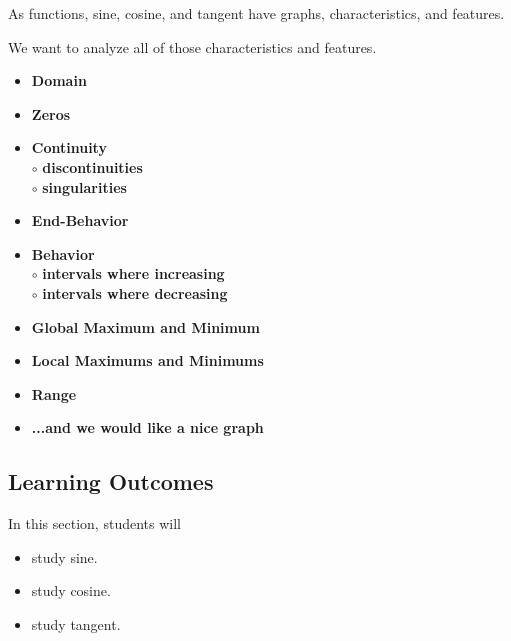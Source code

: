 \documentclass{ximera}
\begin{document}
As functions, sine, cosine, and tangent have graphs, characteristics, and features.


We want to analyze all of those characteristics and features.



\begin{itemize}
     \item \textbf{\textcolor{red!70!black}{Domain}} 
     \item \textbf{\textcolor{red!70!black}{Zeros}} 
     \item \textbf{\textcolor{red!70!black}{Continuity}} \\
     \text{    }$\circ$ \textbf{\textcolor{purple!85!blue}{discontinuities}}\\
     \text{    }$\circ$ \textbf{\textcolor{purple!85!blue}{singularities}}\\
     \item \textbf{\textcolor{red!70!black}{End-Behavior}} 
     \item \textbf{\textcolor{red!70!black}{Behavior}} \\
     \text{    }$\circ$ \textbf{\textcolor{purple!85!blue}{intervals where increasing}}\\
     \text{    }$\circ$ \textbf{\textcolor{purple!85!blue}{intervals where decreasing}}\\
     \item \textbf{\textcolor{red!70!black}{Global Maximum and Minimum}} 
     \item \textbf{\textcolor{red!70!black}{Local Maximums and Minimums}} 
     \item \textbf{\textcolor{red!70!black}{Range}} 
     \item \textbf{\textcolor{blue!55!black}{...and we would like a nice graph}} 
\end{itemize}

















\subsection*{Learning Outcomes}


\begin{sectionOutcomes}
In this section, students will 

\begin{itemize}
\item study sine.
\item study cosine.
\item study tangent.
\end{itemize}
\end{sectionOutcomes}
\end{document}
